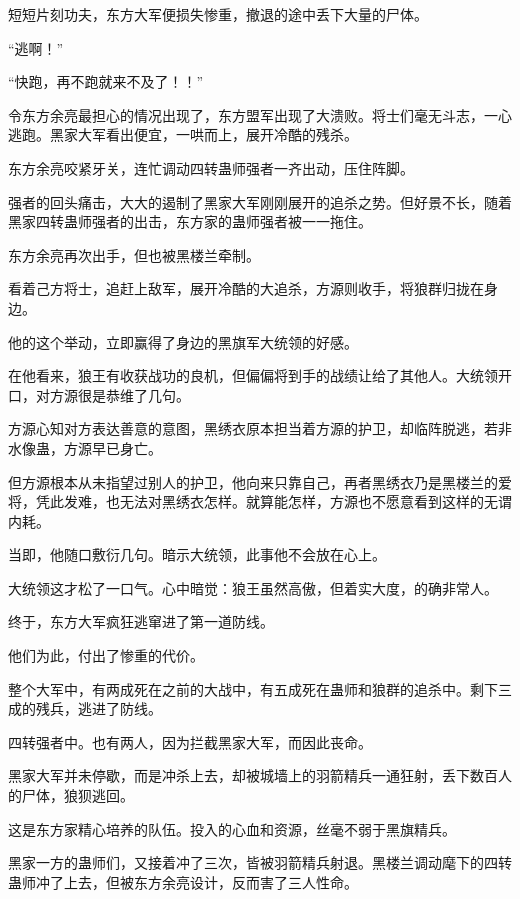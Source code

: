 
\begin{this_body}



短短片刻功夫，东方大军便损失惨重，撤退的途中丢下大量的尸体。

“逃啊！”

“快跑，再不跑就来不及了！！”

令东方余亮最担心的情况出现了，东方盟军出现了大溃败。将士们毫无斗志，一心逃跑。黑家大军看出便宜，一哄而上，展开冷酷的残杀。

东方余亮咬紧牙关，连忙调动四转蛊师强者一齐出动，压住阵脚。

强者的回头痛击，大大的遏制了黑家大军刚刚展开的追杀之势。但好景不长，随着黑家四转蛊师强者的出击，东方家的蛊师强者被一一拖住。

东方余亮再次出手，但也被黑楼兰牵制。

看着己方将士，追赶上敌军，展开冷酷的大追杀，方源则收手，将狼群归拢在身边。

他的这个举动，立即赢得了身边的黑旗军大统领的好感。

在他看来，狼王有收获战功的良机，但偏偏将到手的战绩让给了其他人。大统领开口，对方源很是恭维了几句。

方源心知对方表达善意的意图，黑绣衣原本担当着方源的护卫，却临阵脱逃，若非水像蛊，方源早已身亡。

但方源根本从未指望过别人的护卫，他向来只靠自己，再者黑绣衣乃是黑楼兰的爱将，凭此发难，也无法对黑绣衣怎样。就算能怎样，方源也不愿意看到这样的无谓内耗。

当即，他随口敷衍几句。暗示大统领，此事他不会放在心上。

大统领这才松了一口气。心中暗觉：狼王虽然高傲，但着实大度，的确非常人。

终于，东方大军疯狂逃窜进了第一道防线。

他们为此，付出了惨重的代价。

整个大军中，有两成死在之前的大战中，有五成死在蛊师和狼群的追杀中。剩下三成的残兵，逃进了防线。

四转强者中。也有两人，因为拦截黑家大军，而因此丧命。

黑家大军并未停歇，而是冲杀上去，却被城墙上的羽箭精兵一通狂射，丢下数百人的尸体，狼狈逃回。

这是东方家精心培养的队伍。投入的心血和资源，丝毫不弱于黑旗精兵。

黑家一方的蛊师们，又接着冲了三次，皆被羽箭精兵射退。黑楼兰调动麾下的四转蛊师冲了上去，但被东方余亮设计，反而害了三人性命。


\end{this_body}
